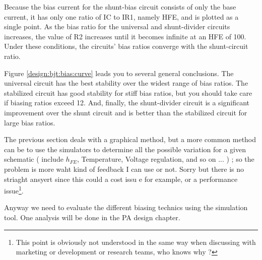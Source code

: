 \bigskip
Because the bias current for the shunt-bias circuit consists of only the base current, it has only one ratio of IC to IR1, namely HFE, and is plotted as a single point. As the bias ratio for the universal and shunt-divider circuits increases, the value of R2 increases until it becomes infinite at an HFE of 100. Under these conditions, the circuits' bias ratios converge with the shunt-circuit ratio.

\bigskip
Figure \ref{design:bjt:bias:curve} leads you to several general conclusions. The universal circuit has the best stability over the widest range of bias ratios. The stabilized circuit has good stability for stiff bias ratios, but you should take care if biasing ratios exceed 12. And, finally, the shunt-divider circuit is a significant improvement over the shunt circuit and is better than the stabilized circuit for large bias ratios.


The previous section deals with a graphical method, but a more common method can be to use the simulators to determine all the possible variation for a given schematic ( include $h_{FE}$, Temperature, Voltage regulation, and so on ... ) ; so the problem is more waht kind of feedback I can use or not. Sorry but there is no striaght ansyert since this could a cost issu e for example, or a performance issue\footnote{This point is obviously not understood in the same way when discussing with marketing or development or research teams, who knows why ?}.

\bigskip

Anyway we need to evaluate the different biasing technics using the simulation tool. One analysis will be done in the PA design chapter.
